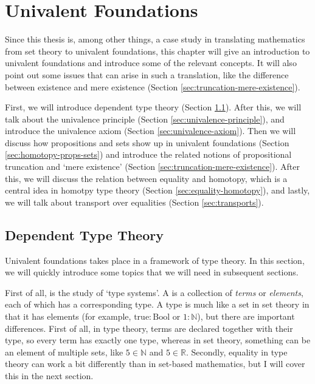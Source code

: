 \chapter{Univalent Foundations}\label{ch:univalent-foundations}

Since this thesis is, among other things, a case study in translating mathematics from set theory to univalent foundations, this chapter will give an introduction to univalent foundations and introduce some of the relevant concepts. It will also point out some issues that can arise in such a translation, like the difference between existence and mere existence (Section \ref{sec:truncation-mere-existence}).

First, we will introduce dependent type theory (Section \ref{sec:dependent-type-theory}). After this, we will talk about the univalence principle (Section \ref{sec:univalence-principle}), and introduce the univalence axiom (Section \ref{sec:univalence-axiom}). Then we will discuss how propositions and sets show up in univalent foundations (Section \ref{sec:homotopy-props-sets}) and introduce the related notions of propositional truncation and `mere existence' (Section \ref{sec:truncation-mere-existence}). After this, we will discuss the relation between equality and homotopy, which is a central idea in homotpy type theory (Section \ref{sec:equality-homotopy}), and lastly, we will talk about transport over equalities (Section \ref{sec:transports}).

\section{Dependent Type Theory}\label{sec:dependent-type-theory}
Univalent foundations takes place in a framework of type theory. In this section, we will quickly introduce some topics that we will need in subsequent sections.

First of all,  is the study of `type systems'. A  is a collection of \textit{terms} or \textit{elements}, each of which has a corresponding type. A type is much like a set in set theory in that it has elements (for example, $ \mathrm{true}: \mathrm{Bool} $ or $ 1: \mathbb N $), but there are important differences. First of all, in type theory, terms are declared together with their type, so every term has exactly one type, whereas in set theory, something can be an element of multiple sets, like $ 5 \in \mathbb N $ and $ 5 \in \mathbb R $. Secondly, equality in type theory can work a bit differently than in set-based mathematics, but I will cover this in the next section.

